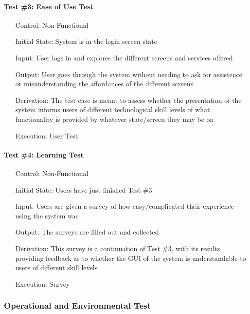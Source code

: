 \documentclass[12pt, titlepage]{article}
\begin{document}
\paragraph*{Test \#3: Ease of Use Test}
\begin{itemize}
	\item[Control:] Non-Functional
	\item[Initial State:] System is in the login screen state
	\item[Input:] User logs in and explores the different screens and services offered
	\item[Output:] User goes through the system without needing to ask for assistence or misunderstanding the affordances of the different screens
	\item[Derivation:] The test case is meant to assess whether the presentation of the system informs users of different technological skill levels of what functionality is provided by whatever state/screen they may be on
	\item[Execution:] User Test
\end{itemize}

\paragraph*{Test \#4: Learning Test}
\begin{itemize}
	\item[Control:] Non-Functional
	\item[Initial State:] Users have just finished Test \#3
	\item[Input:] Users are given a survey of how easy/complicated their experience using the system was
	\item[Output:] The surveys are filled out and collected
	\item[Derivation:] This survey is a continuation of Test \#3, with its results providing feedback as to whether the GUI of the system is understandable to users of different skill levels
	\item[Execution:] Survey
\end{itemize}

\subsubsection{Operational and Environmental Test}
\end{document}

